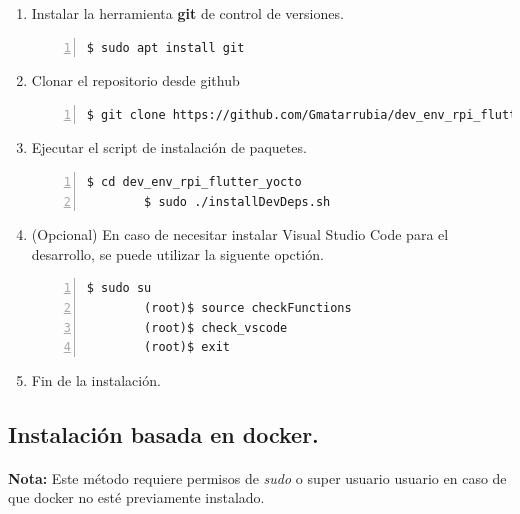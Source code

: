 \begin{enumerate}
    \item Instalar la herramienta \textbf{\gls{git}} de control de versiones.
    \begin{lstlisting}[style=consola, numbers=left]
        $ sudo apt install git
    \end{lstlisting}

    \item Clonar el repositorio desde github
    \begin{lstlisting}[style=consola, numbers=left]
        $ git clone https://github.com/Gmatarrubia/dev_env_rpi_flutter_yocto.git
    \end{lstlisting}

    \item Ejecutar el script de instalación de paquetes.
    \begin{lstlisting}[style=consola, numbers=left]
        $ cd dev_env_rpi_flutter_yocto
        $ sudo ./installDevDeps.sh
    \end{lstlisting}

    \item (Opcional) En caso de necesitar instalar Visual Studio Code para el desarrollo,
    se puede utilizar la siguente opctión.
    \begin{lstlisting}[style=consola, numbers=left]
        $ sudo su
        (root)$ source checkFunctions
        (root)$ check_vscode
        (root)$ exit
    \end{lstlisting}

    \item Fin de la instalación.
\end{enumerate}

\subsection{Instalación basada en docker.}

\paragraph{}\textbf{Nota:} Este método requiere permisos de \emph{sudo} o super usuario
usuario en caso de que docker no esté previamente instalado.

